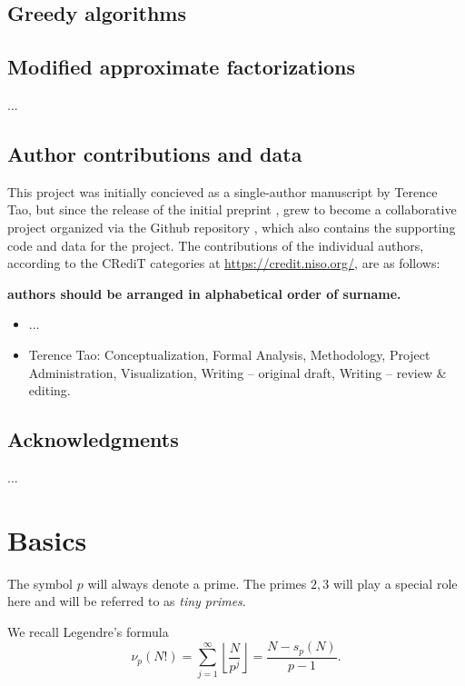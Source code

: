 \documentclass[12pt,a4paper,reqno]{amsart}
\numberwithin{equation}{section}
\theoremstyle{plain}
\theoremstyle{definition}
\begin{document}
\subsection{Greedy algorithms}

\subsection{Modified approximate factorizations}



...


\subsection{Author contributions and data}

This project was initially concieved as a single-author manuscript by Terence Tao, but since the release of the initial preprint \cite{tao}, grew to become a collaborative project organized via the Github repository \cite{github}, which also contains the supporting code and data for the project.  The contributions of the individual authors, according to the CRediT categories at \url{https://credit.niso.org/}, are as follows:

{\bf authors should be arranged in alphabetical order of surname.  }

\begin{itemize}
\item ...
\item Terence Tao: Conceptualization, Formal Analysis, Methodology, Project Administration, Visualization, Writing -- original draft, Writing -- review \& editing.
\end{itemize}

\subsection{Acknowledgments}

...

\section{Basics}

The symbol $p$ will always denote a prime.  The primes $2,3$ will play a special role here and will be referred to as \emph{tiny primes}.



We recall Legendre's formula
\begin{equation}\label{legendre}
  \nu_p(N!) = \sum_{j=1}^\infty \left\lfloor \frac{N}{p^j} \right\rfloor = \frac{N - s_p(N)}{p-1}.
\end{equation}
\end{document}
